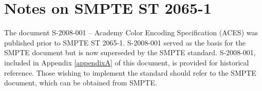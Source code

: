 \numberedformat
\chapter{Notes on SMPTE ST 2065-1}

The document S-2008-001 -- Academy Color Encoding Specification (ACES) was published prior to SMPTE ST 2065-1. S-2008-001 served as the basis for the SMPTE document but is now superseded by the SMPTE standard. S-2008-001, included in Appendix \ref{appendixA} of this document, is provided for historical reference. Those wishing to implement the standard should refer to the SMPTE document, which can be obtained from SMPTE.